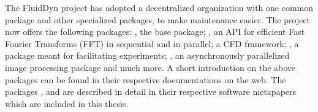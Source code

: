 The FluidDyn project has adopted a decentralized organization with one common
package and other specialized packages, to make maintenance easier.
%
The project now offers the following packages:
%
,
the base package; %
, an API for efficient Fast Fourier Transforms (FFT) in sequential and in
parallel; 
a CFD framework; , a package meant for
facilitating experiments; , an asynchronously parallelized
image processing package and much more.
%
A short introduction on the above packages can be found in their respective
documentations on the web. The packages , 
and  are described in detail in their respective software
metapapers
\citep[]{fluiddyn, fluidfft, fluidsim} which are included in this thesis.
